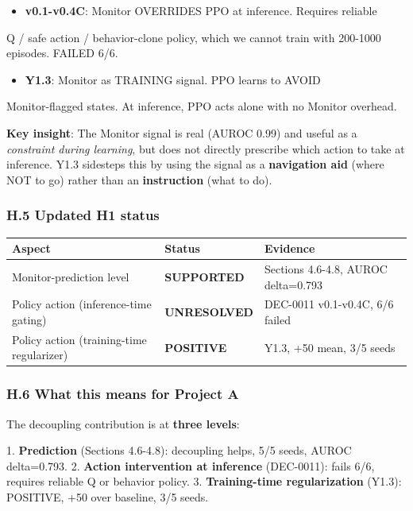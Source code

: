 \documentclass[11pt]{article}
\begin{document}
\begin{itemize}
  \item \textbf{v0.1-v0.4C}: Monitor OVERRIDES PPO at inference. Requires reliable
\end{itemize}

  Q / safe action / behavior-clone policy, which we cannot train with
  200-1000 episodes. FAILED 6/6.

\begin{itemize}
  \item \textbf{Y1.3}: Monitor as TRAINING signal. PPO learns to AVOID
\end{itemize}

  Monitor-flagged states. At inference, PPO acts alone with no Monitor
  overhead.

\textbf{Key insight}: The Monitor signal is real (AUROC 0.99) and useful as a
\textit{constraint during learning}, but does not directly prescribe which action
to take at inference. Y1.3 sidesteps this by using the signal as a
\textbf{navigation aid} (where NOT to go) rather than an \textbf{instruction} (what to do).

\subsubsection{H.5 Updated H1 status}

\begin{tabular}{lll}
Aspect & Status & Evidence \\
\hline
Monitor-prediction level & \textbf{SUPPORTED} & Sections 4.6-4.8, AUROC delta=0.793 \\
Policy action (inference-time gating) & \textbf{UNRESOLVED} & DEC-0011 v0.1-v0.4C, 6/6 failed \\
Policy action (training-time regularizer) & \textbf{POSITIVE} & Y1.3, +50 mean, 3/5 seeds \\
\end{tabular}


\subsubsection{H.6 What this means for Project A}

The decoupling contribution is at \textbf{three levels}:

1. \textbf{Prediction} (Sections 4.6-4.8): decoupling helps, 5/5 seeds, AUROC delta=0.793.
2. \textbf{Action intervention at inference} (DEC-0011): fails 6/6, requires reliable Q or behavior policy.
3. \textbf{Training-time regularization} (Y1.3): POSITIVE, +50 over baseline, 3/5 seeds.
\end{document}
